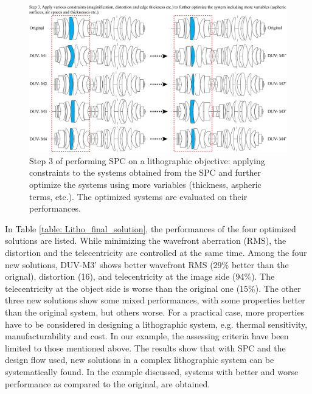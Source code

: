 \begin{figure}[h!]
    \centering
    \includegraphics[width=\textwidth]{chapter-4/figures/Litho_SPC_minima_listed.png}
    \caption{Step 3 of performing SPC on a lithographic objective: applying constraints to the systems obtained from the SPC and further optimize the systems using more variables (thickness, aspheric terms, etc.). The optimized systems are evaluated on their performances.}
    \label{fig: litho_Step3}
\end{figure}

In Table \ref{table: Litho_final_solution}, the performances of the four optimized solutions are listed. While minimizing the wavefront aberration (RMS), the distortion and the telecentricity are controlled at the same time. Among the four new solutions, DUV-M3' shows better wavefront RMS (29$\%$ better than the orignal), distortion (16\text{\%}), and telecentricity at the image side (94$\%$). The telecentricity at the object side is worse than the original one (15$\%$). The other three new solutions show some mixed performances, with some properties better than the original system, but others worse. For a practical case, more properties have to be considered in designing a lithographic system, e.g. thermal sensitivity, manufacturability and cost. In our example, the assessing criteria have been limited to those mentioned above. The results show that with SPC and the design flow used, new solutions in a complex lithographic system can be systematically found. In the example discussed, systems with better and worse performance as compared to the original, are obtained. 

